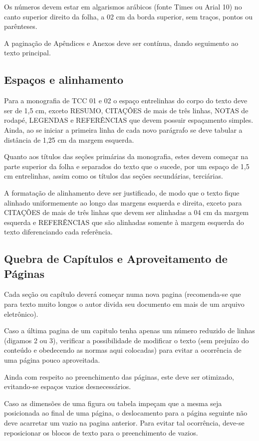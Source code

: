 Os números devem estar em algarismos arábicos (fonte Times ou Arial 10) no
canto superior direito da folha, a 02 cm da borda superior, sem traços,
pontos ou parênteses.

A paginação de Apêndices e Anexos deve ser contínua, dando seguimento ao
texto principal.

\subsection{Espaços e alinhamento}

Para a monografia de TCC 01 e 02 o espaço entrelinhas do corpo do texto
deve ser de 1,5 cm, exceto RESUMO, CITAÇÔES de mais de três linhas, NOTAS
de rodapé, LEGENDAS e REFERÊNCIAS que devem possuir espaçamento simples.
Ainda, ao se iniciar a primeira linha de cada novo parágrafo se deve
tabular a distância de 1,25 cm da margem esquerda.

Quanto aos títulos das seções primárias da monografia, estes devem começar
na parte superior da folha e separados do texto que o sucede, por um espaço
de 1,5 cm entrelinhas, assim como os títulos das seções secundárias,
terciárias.

A formatação de alinhamento deve ser justificado, de modo que o texto fique
alinhado uniformemente ao longo das margens esquerda e direita, exceto para
CITAÇÕES de mais de três linhas que devem ser alinhadas a 04 cm da margem
esquerda e REFERÊNCIAS que são alinhadas somente à margem esquerda do texto
diferenciando cada referência.

\subsection{Quebra de Capítulos e Aproveitamento de Páginas}

Cada seção ou capítulo deverá começar numa nova pagina (recomenda-se que
para texto muito longos o autor divida seu documento em mais de um arquivo
eletrônico).

Caso a última pagina de um capitulo tenha apenas um número reduzido de
linhas (digamos 2 ou 3), verificar a possibilidade de modificar o texto
(sem prejuízo do conteúdo e obedecendo as normas aqui colocadas) para
evitar a ocorrência de uma página pouco aproveitada.

Ainda com respeito ao preenchimento das páginas, este deve ser otimizado,
evitando-se espaços vazios desnecessários.

Caso as dimensões de uma figura ou tabela impeçam que a mesma seja
posicionada ao final de uma página, o deslocamento para a página seguinte
não deve acarretar um vazio na pagina anterior. Para evitar tal ocorrência,
deve-se reposicionar os blocos de texto para o preenchimento de vazios.

